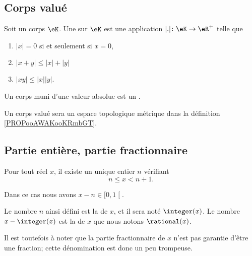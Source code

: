 \subsection{Corps valué}

\begin{definition}       \label{DEFooBWXXooAkBBRS}
	Soit un corps \( \eK\). Une  sur \(\eK\) est une application \( | . |\colon \eK\to \eR^+\) telle que
	\begin{enumerate}
		\item
		      \( | x |=0\) si et seulement si \( x=0\),
		\item
		      \( | x+y |\leq | x |+| y |\)
		\item
		      \( | xy |\leq | x | | y |\).
	\end{enumerate}
	Un corps muni d'une valeur absolue est un .
\end{definition}
Un corps valué sera un espace topologique métrique dans la définition \ref{PROPooAWAKooKRmbGT}.

\subsection{Partie entière, partie fractionnaire}

\begin{lemmaDef}      \label{LEMooLEXTooGAQxGB}
	Pour tout réel \( x\), il existe un unique entier \( n\) vérifiant
	\begin{equation}
		n\leq x<n+1.
	\end{equation}

	Dans ce cas nous avons \( x-n\in\mathopen[ 0 , 1 \mathclose[\).

	Le nombre \( n\) ainsi défini est la  de \( x\), et il sera noté \( \integer(x)\). Le nombre \( x-\integer(x)\) est la  de \( x\) que nous notons \( \rational(x)\).

	Il est toutefois à noter que la partie fractionnaire de \( x\) n'est pas garantie d'être une fraction; cette dénomination est donc un peu trompeuse.
\end{lemmaDef}


